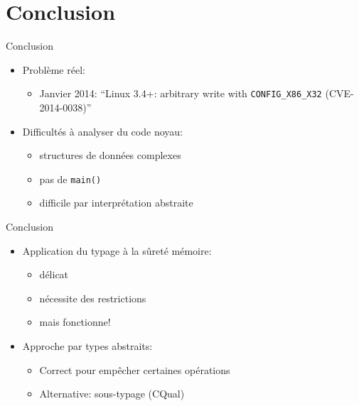 \section{Conclusion}

\begin{frame}{Conclusion}
    \begin{itemize}
    \item Problème réel:
        \begin{itemize}
            \item Janvier 2014:
                \enquote{Linux 3.4+: arbitrary write with \texttt{CONFIG\_X86\_X32} (CVE-2014-0038)}
        \end{itemize}
    \item Difficultés à analyser du code noyau:
        \begin{itemize}
            \item structures de données complexes
            \item pas de \texttt{main()}
            \item difficile par interprétation abstraite
        \end{itemize}
    \end{itemize}
\end{frame}

\begin{frame}{Conclusion}
    \begin{itemize}
    \item Application du typage à la sûreté mémoire:
        \begin{itemize}
            \item délicat
            \item nécessite des restrictions
            \item mais fonctionne!
        \end{itemize}
    \item Approche par types abstraits:
        \begin{itemize}
            \item Correct pour empêcher certaines opérations
            \item Alternative: sous-typage (CQual)
        \end{itemize}
    \end{itemize}
\end{frame}


